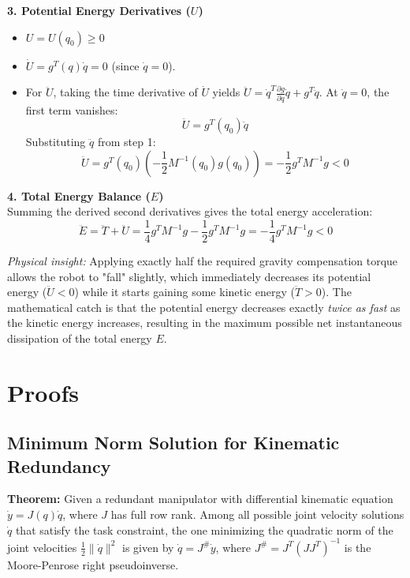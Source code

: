 \documentclass[11pt,a4paper]{article}
\begin{document}
\textbf{3. Potential Energy Derivatives ($U$)}
\begin{itemize}
    \item $U = U(q_0) \ge 0$
    \item $\dot{U} = g^T(q) \dot{q} = 0$ (since $\dot{q} = 0$).
    \item For $\ddot{U}$, taking the time derivative of $\dot{U}$ yields $\ddot{U} = \dot{q}^T \frac{\partial g}{\partial q} \dot{q} + g^T \ddot{q}$. At $\dot{q}=0$, the first term vanishes:
    \begin{equation}
        \ddot{U} = g^T(q_0) \ddot{q}
    \end{equation}
    Substituting $\ddot{q}$ from step 1:
    \begin{equation}
        \ddot{U} = g^T(q_0) \left(-\frac{1}{2}M^{-1}(q_0)g(q_0)\right) = -\frac{1}{2}g^T M^{-1} g < 0
    \end{equation}
\end{itemize}

\textbf{4. Total Energy Balance ($E$)} \\
Summing the derived second derivatives gives the total energy acceleration:
\begin{equation}
    \ddot{E} = \ddot{T} + \ddot{U} = \frac{1}{4}g^T M^{-1} g - \frac{1}{2}g^T M^{-1} g = -\frac{1}{4}g^T M^{-1} g < 0
\end{equation}

\textit{Physical insight:} Applying exactly half the required gravity compensation torque allows the robot to "fall" slightly, which immediately decreases its potential energy ($\ddot{U} < 0$) while it starts gaining some kinetic energy ($\ddot{T} > 0$). The mathematical catch is that the potential energy decreases exactly \emph{twice as fast} as the kinetic energy increases, resulting in the maximum possible net instantaneous dissipation of the total energy $E$.

\newpage

\section{Proofs}

\subsection{Minimum Norm Solution for Kinematic Redundancy}
\textbf{Theorem:} Given a redundant manipulator with differential kinematic equation $\dot{y} = J(q)\dot{q}$, where $J$ has full row rank. Among all possible joint velocity solutions $\dot{q}$ that satisfy the task constraint, the one minimizing the quadratic norm of the joint velocities $\frac{1}{2} \|\dot{q}\|^2$ is given by $\dot{q} = J^\# \dot{y}$, where $J^\# = J^T(JJ^T)^{-1}$ is the Moore-Penrose right pseudoinverse.
\end{document}
